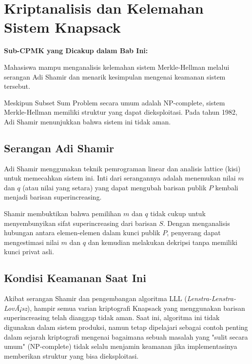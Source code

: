 ﻿%
\section{Kriptanalisis dan Kelemahan Sistem Knapsack}

\vspace{0.5cm}
\noindent\colorbox{blue!10}{\parbox{\dimexpr\textwidth-2\fboxsep}{\textbf{\large Sub-CPMK yang Dicakup dalam Bab Ini:}}}
\vspace{0.3cm}
\begin{itemize}[leftmargin=*, itemsep=5pt]
Mahasiswa mampu menganalisis kelemahan sistem Merkle-Hellman melalui serangan Adi Shamir dan menarik kesimpulan mengenai keamanan sistem tersebut.
\end{itemize}
\vspace{0.5cm}

Meskipun Subset Sum Problem secara umum adalah NP-complete, sistem Merkle-Hellman memiliki struktur yang dapat dieksploitasi. Pada tahun 1982, Adi Shamir menunjukkan bahwa sistem ini tidak aman.

\subsection{Serangan Adi Shamir}
Adi Shamir menggunakan teknik pemrograman linear dan analisis lattice (kisi) untuk memecahkan sistem ini. Inti dari serangannya adalah menemukan nilai $m$ dan $q$ (atau nilai yang setara) yang dapat mengubah barisan publik $P$ kembali menjadi barisan superincreasing.

Shamir membuktikan bahwa pemilihan $m$ dan $q$ tidak cukup untuk menyembunyikan sifat superincreasing dari barisan $S$. Dengan menganalisis hubungan antara elemen-elemen dalam kunci publik $P$, penyerang dapat mengestimasi nilai $m$ dan $q$ dan kemudian melakukan dekripsi tanpa memiliki kunci privat asli.

\subsection{Kondisi Keamanan Saat Ini}
Akibat serangan Shamir dan pengembangan algoritma LLL (\textit{Lenstra-Lenstra-LovÃ¡sz}), hampir semua varian kriptografi Knapsack yang menggunakan barisan superincreasing telah dianggap tidak aman. Saat ini, algoritma ini tidak digunakan dalam sistem produksi, namun tetap dipelajari sebagai contoh penting dalam sejarah kriptografi mengenai bagaimana sebuah masalah yang "sulit secara umum" (NP-complete) tidak selalu menjamin keamanan jika implementasinya memberikan struktur yang bisa dieksploitasi.

